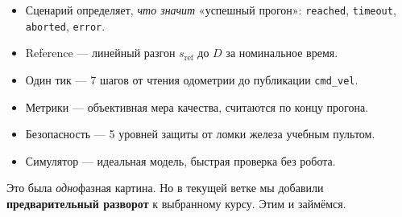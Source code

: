\begin{itemize}
  \item Сценарий определяет, \emph{что значит} «успешный прогон»:
        \texttt{reached}, \texttt{timeout}, \texttt{aborted}, \texttt{error}.
  \item Reference --- линейный разгон $s_\text{ref}$ до $D$ за
        номинальное время.
  \item Один тик --- 7 шагов от чтения одометрии до публикации
        \texttt{cmd\_vel}.
  \item Метрики --- объективная мера качества, считаются по концу
        прогона.
  \item Безопасность --- 5 уровней защиты от ломки железа учебным
        пультом.
  \item Симулятор --- идеальная модель, быстрая проверка без робота.
\end{itemize}

Это была \emph{одно}фазная картина. Но в текущей ветке мы добавили
\textbf{предварительный разворот} к выбранному курсу. Этим и
займёмся.
